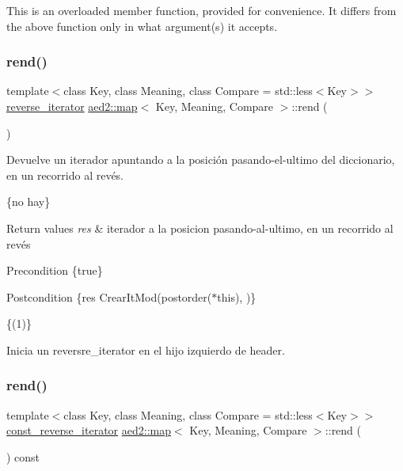 This is an overloaded member function, provided for convenience. It differs from the above function only in what argument(s) it accepts. \mbox{\label{classaed2_1_1map_a277f03b4f4b6b98879e4e4921081801f}} 
\subsubsection{\texorpdfstring{rend()}{rend()}\hspace{0.1cm}{\footnotesize\ttfamily [1/2]}}
{\footnotesize\ttfamily template$<$class Key, class Meaning, class Compare = std\+::less$<$\+Key$>$$>$ \\
\hyperlink{classaed2_1_1map_a8e6a592062260177fd73b2f9897b1dd5}{reverse\+\_\+iterator} \hyperlink{classaed2_1_1map}{aed2\+::map}$<$ Key, Meaning, Compare $>$\+::rend (\begin{DoxyParamCaption}{ }\end{DoxyParamCaption})\hspace{0.3cm}{\ttfamily [inline]}}



Devuelve un iterador apuntando a la posición pasando-\/el-\/ultimo del diccionario, en un recorrido al revés. 

\{no hay\}


\begin{DoxyRetVals}{Return values}
{\em res} & iterador a la posicion pasando-\/al-\/ultimo, en un recorrido al revés\\
\hline
\end{DoxyRetVals}
\begin{DoxyPrecond}{Precondition}
\{true\} 
\end{DoxyPrecond}
\begin{DoxyPostcond}{Postcondition}
\{res  Crear\+It\+Mod(postorder($\ast$this),  )\}
\end{DoxyPostcond}
\{(1)\}

Inicia un reversre\+\_\+iterator en el hijo izquierdo de header. \mbox{\label{classaed2_1_1map_a7cf14a4b505505d0f074034b7399fb24}} 
\subsubsection{\texorpdfstring{rend()}{rend()}\hspace{0.1cm}{\footnotesize\ttfamily [2/2]}}
{\footnotesize\ttfamily template$<$class Key, class Meaning, class Compare = std\+::less$<$\+Key$>$$>$ \\
\hyperlink{classaed2_1_1map_aed66a216549d13078a3ea6978ea0b768}{const\+\_\+reverse\+\_\+iterator} \hyperlink{classaed2_1_1map}{aed2\+::map}$<$ Key, Meaning, Compare $>$\+::rend (\begin{DoxyParamCaption}{ }\end{DoxyParamCaption}) const\hspace{0.3cm}{\ttfamily [inline]}}

